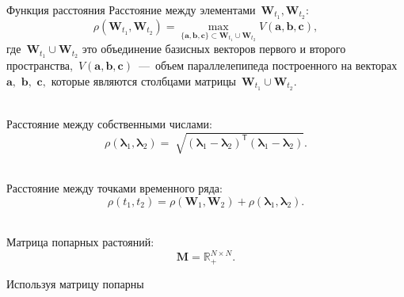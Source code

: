 \documentclass[9pt,pdf,hyperref={unicode}]{beamer}
\begin{document}
\begin{frame}[shrink=5]{Функция расстояния}
\justifying
Расстояние между элементами~$\mathbf{W}_{t_1},\mathbf{W}_{t_2}$:\\
$$
\rho\left(\textbf{W}_{t_1}, \textbf{W}_{t_2}\right) = \max_{\{\textbf{a},\textbf{b},\textbf{c}\} \subset \textbf{W}_{t_1}\cup \textbf{W}_{t_2} } V\left(\textbf{a},\textbf{b},\textbf{c}\right), 
$$
где~$\textbf{W}_{t_1}\cup\textbf{W}_{t_2}$ это объединение базисных векторов первого и второго пространства,~$V\left(\textbf{a},\textbf{b},\textbf{c}\right)$~---~объем параллелепипеда построенного на векторах~$\textbf{a},$ $\textbf{b},$ $\textbf{c},$ которые являются столбцами матрицы~$\textbf{W}_{t_1}\cup\textbf{W}_{t_2}$.

~\\
Расстояние между собственными числами:\\
$$
\rho\left(\bm{\lambda}_1, \bm{\lambda}_2\right) = \sqrt[]{\left(\bm{\lambda}_1 - \bm{\lambda}_2\right)^{\mathsf{T}}\left(\bm{\lambda}_1 - \bm{\lambda}_2\right)}.
$$

~\\
Расстояние между точками временного ряда:\\
$$
\rho\left(t_1, t_2\right) = \rho\left(\textbf{W}_1, \textbf{W}_2\right) + \rho\left(\bm{\lambda}_1, \bm{\lambda}_2\right).
$$

~\\
Матрица попарных растояний:\\
$$\textbf{M} = \mathbb{R}_{+}^{N\times N}.$$

Используя матрицу попарны
\end{frame}
\end{document}
